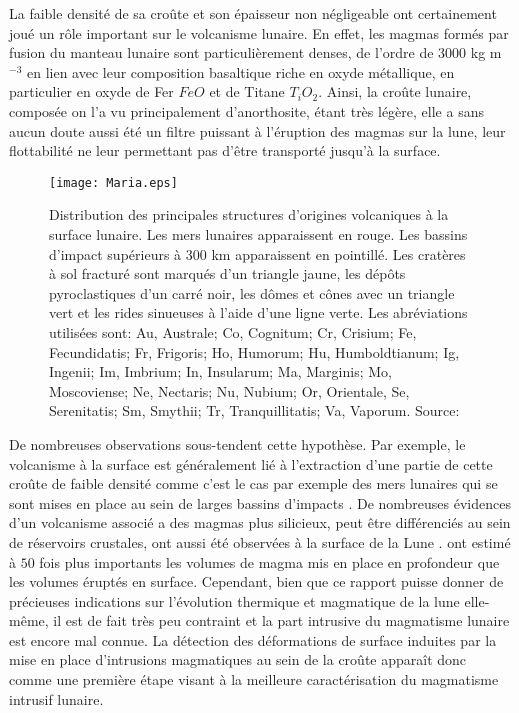 La faible densité de sa croûte et son épaisseur non négligeable ont
certainement joué un rôle important sur le volcanisme lunaire. En
effet, les magmas formés par fusion du manteau lunaire sont
particulièrement denses, de l'ordre de $3000$ kg m$^{-3}$
\citep{Kiefer:2012kp} en lien avec leur composition basaltique riche
en oxyde métallique, en particulier en oxyde de Fer $FeO$ et de
Titane $T_iO_2$. Ainsi, la croûte lunaire, composée on l'a vu
principalement d'anorthosite, étant très légère, elle a sans aucun
doute aussi été un filtre puissant à l'éruption des magmas sur la
lune, leur flottabilité ne leur permettant pas d'être transporté
jusqu'à la surface.
\begin{figure}[h!]
 \begin{center}
 \graphicspath{ {/Users/thorey/Documents/These/Manuscript/Figure/Chapter1/} }
 \texttt{[image: Maria.eps]}
 \caption{Distribution des principales structures d'origines
 volcaniques à la surface lunaire. Les mers lunaires
 apparaissent en rouge. Les bassins d'impact supérieurs à $300$
 km apparaissent en pointillé. Les cratères à sol fracturé sont
 marqués d'un triangle jaune, les dépôts pyroclastiques d'un
 carré noir, les dômes et cônes avec un triangle vert et les
 rides sinueuses à l'aide d'une ligne verte. Les abréviations
 utilisées sont: Au, Australe; Co, Cognitum; Cr, Crisium; Fe,
 Fecundidatis; Fr, Frigoris; Ho, Humorum; Hu, Humboldtianum; Ig,
 Ingenii; Im, Imbrium; In, Insularum; Ma, Marginis; Mo,
 Moscoviense; Ne, Nectaris; Nu, Nubium; Or, Orientale, Se,
 Serenitatis; Sm, Smythii; Tr, Tranquillitatis; Va, Vaporum.
 Source: \citet{Platz:2015ex}}
 \label{Maria}
 \end{center}
\end{figure}

De nombreuses observations sous-tendent cette hypothèse. Par exemple,
le volcanisme à la surface est généralement lié à l'extraction d'une
partie de cette croûte de faible densité comme c'est le cas par
exemple des mers lunaires qui se sont mises en place au sein de larges
bassins d'impacts \citet{Wieczorek:2001jt}. De nombreuses évidences
d'un volcanisme associé a des magmas plus silicieux, peut être
différenciés au sein de réservoirs crustales, ont aussi été observées
à la surface de la Lune
\citep{Jolliff:2011he,Glotch:2010ih,Glotch:2011tk}.
\citet{Head:1992bk} ont estimé à $50$ fois plus importants les volumes
de magma mis en place en profondeur que les volumes éruptés en
surface. Cependant, bien que ce rapport puisse donner de précieuses
indications sur l'évolution thermique et magmatique de la lune
elle-même, il est de fait très peu contraint et la part intrusive du
magmatisme lunaire est encore mal connue. La détection des
déformations de surface induites par la mise en place d'intrusions
magmatiques au sein de la croûte apparaît donc comme une première
étape visant à la meilleure caractérisation du magmatisme intrusif
lunaire.

